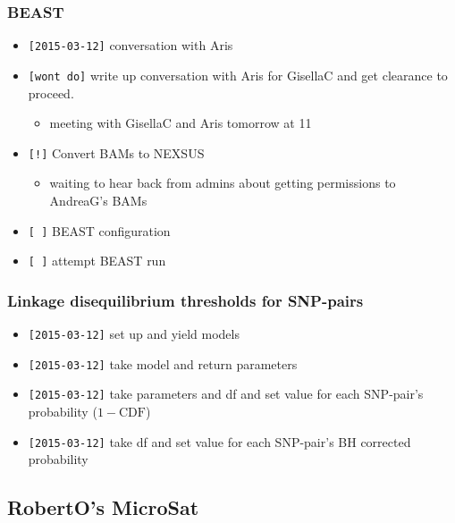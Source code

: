 \documentclass[letterpaper]{scrartcl}
\begin{document}
\subsubsection{BEAST}\label{beast}

\begin{itemize}
\itemsep1pt\parskip0pt
\item
  \texttt{{[}2015-03-12{]}} conversation with Aris
\item
  \texttt{{[}wont do{]}} write up conversation with Aris for GisellaC
  and get clearance to proceed.

  \begin{itemize}
  \itemsep1pt\parskip0pt
  \item
    meeting with GisellaC and Aris tomorrow at 11
  \end{itemize}
\item
  \texttt{{[}!{]}} Convert BAMs to NEXSUS

  \begin{itemize}
  \itemsep1pt\parskip0pt
  \item
    waiting to hear back from admins about getting permissions to
    AndreaG's BAMs
  \end{itemize}
\item
  \texttt{{[} {]}} BEAST configuration
\item
  \texttt{{[} {]}} attempt BEAST run
\end{itemize}

\subsubsection{Linkage disequilibrium thresholds for
SNP-pairs}\label{linkage-disequilibrium-thresholds-for-snp-pairs}

\begin{itemize}
\itemsep1pt\parskip0pt
\item
  \texttt{{[}2015-03-12{]}} set up and yield models
\item
  \texttt{{[}2015-03-12{]}} take model and return parameters
\item
  \texttt{{[}2015-03-12{]}} take parameters and df and set value for
  each SNP-pair's probability (\(1-\mathrm{CDF}\))
\item
  \texttt{{[}2015-03-12{]}} take df and set value for each SNP-pair's BH
  corrected probability
\end{itemize}

\subsection{RobertO's MicroSat}\label{robertos-microsat-2}
\end{document}

